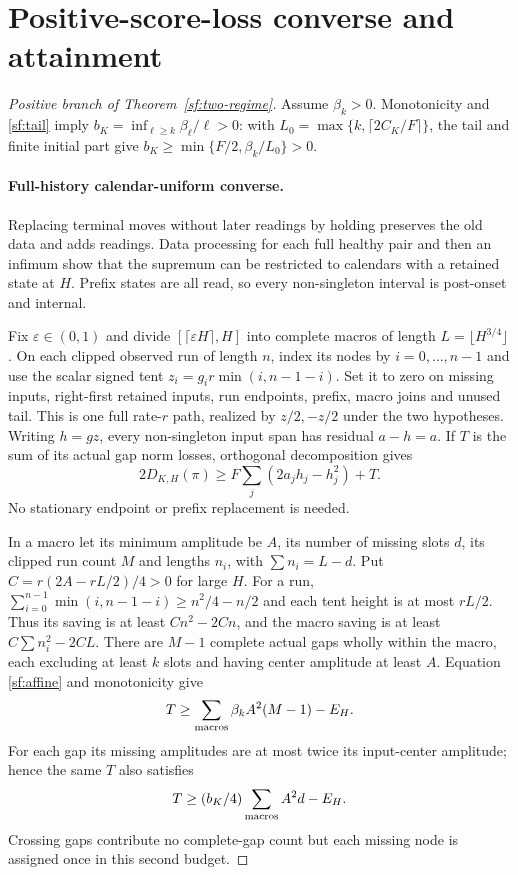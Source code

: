 \section{Positive-score-loss converse and attainment}\label{sf:positive-proof}
\begin{proof}[Positive branch of Theorem~\ref{sf:two-regime}]
Assume $\beta_k>0$. Monotonicity and \eqref{sf:tail} imply
$b_K=\inf_{\ell\ge k}\beta_\ell/\ell>0$: with
$L_0=\max\{k,\lceil2C_K/F\rceil\}$, the tail and finite initial part give
$b_K\ge\min\{F/2,\beta_k/L_0\}>0$.
\paragraph{Full-history calendar-uniform converse.}
Replacing terminal moves without later readings by holding preserves the old
data and adds readings. Data processing for each full healthy pair and then
an infimum show that the supremum can be restricted to calendars with a
retained state at $H$. Prefix states are all read, so every non-singleton interval is
post-onset and internal.

Fix $\varepsilon\in(0,1)$ and divide $[\lceil\varepsilon H\rceil,H]$
into complete macros
of length $L=\lfloor H^{3/4}\rfloor$.
On each clipped observed run of length $n$, index its nodes by
$i=0,\ldots,n-1$ and use the scalar signed tent
$z_i=g_i r\min(i,n-1-i)$.
Set it to zero on missing inputs, right-first retained inputs, run endpoints,
prefix, macro joins and unused tail. This is one full rate-$r$ path, realized
by $z/2,-z/2$ under the two hypotheses.
Writing $h=gz$, every non-singleton input span has residual $a-h=a$.
If $T$ is the sum of its actual gap norm losses, orthogonal decomposition gives
\begin{equation}\label{sf:converse}
2D_{K,H}(\pi)\ge F\sum_j(2a_jh_j-h_j^2)+T .
\end{equation}
No stationary endpoint or prefix replacement is needed.

In a macro let its minimum amplitude be $A$, its number of missing slots $d$,
its clipped run count $M$ and lengths $n_i$, with $\sum n_i=L-d$.
Put $C=r(2A-rL/2)/4>0$ for large $H$.
For a run, $\sum_{i=0}^{n-1}\min(i,n-1-i)\ge n^2/4-n/2$
and each tent height is at most $rL/2$. Thus its saving is at least
$Cn^2-2Cn$, and the macro saving is at least $C\sum n_i^2-2CL$.
There are $M-1$ complete actual gaps wholly within the macro, each excluding at least
$k$ slots and having center amplitude at least $A$.
Equation \eqref{sf:affine} and monotonicity give
\[
T\ge\sum_{\rm macros}\beta_kA^2(M-1)-E_H.
\]
For each gap its missing amplitudes are at most twice its input-center
amplitude; hence the same $T$ also satisfies
\[
T\ge(b_K/4)\sum_{\rm macros}A^2d-E_H .
\]
Crossing gaps contribute no complete-gap count but each missing node is
assigned once in this second budget.


\end{proof}
